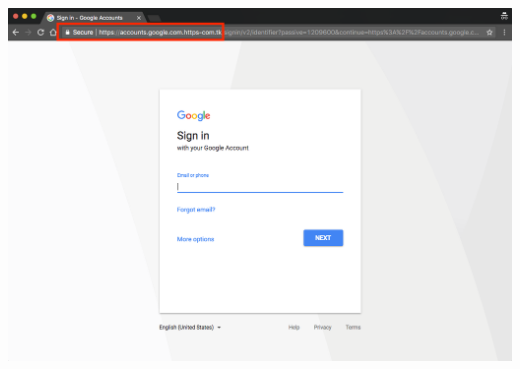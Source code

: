 \documentclass[nobackground,dvipsnames,table]{beamer}
\begin{document}
\begin{frame}{}%
    \thispagestyle{empty}
    \includegraphics[width=\paperwidth]{bad-link-browser}
\end{frame}
\end{document}
